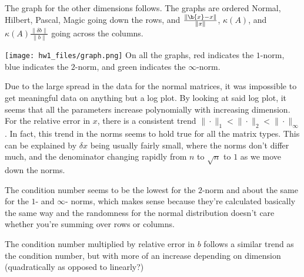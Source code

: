 \documentclass{article}
\begin{document}
The graph for the other dimensions follows. The graphs are ordered Normal, Hilbert, Pascal, Magic going down the rows, and $\frac{\|\h{x}-x\|}{\|x\|}$, $\kappa(A)$, and $\kappa(A)\frac{\|\delta b\|}{\|b\|}$ going across the columns. 

\texttt{[image: hw1\_files/graph.png]}
On all the graphs, red indicates the $1$-norm, blue indicates the $2$-norm, and green indicates the $\infty$-norm.

Due to the large spread in the data for the normal matrices, it was impossible to get meaningful data on anything but a log plot. By looking at said log plot, it seems that all the parameters increase polynomially with increasing dimension. For the relative error in $x$, there is a consistent trend $\|\cdot\|_1<\|\cdot\|_2<\|\cdot\|_\infty$. In fact, this trend in the norms seems to hold true for all the matrix types. This can be explained by $\delta x$ being usually fairly small, where the norms don't differ much, and the denominator changing rapidly from $n$ to $\sqrt{n}$ to $1$ as we move down the norms. 

The condition number seems to be the lowest for the $2$-norm and about the same for the $1$- and $\infty$- norms, which makes sense because they're calculated basically the same way and the randomness for the normal distribution doesn't care whether you're summing over rows or columns. 

The condition number multiplied by relative error in $b$ follows a similar trend as the condition number, but with more of an increase depending on dimension (quadratically as opposed to linearly?)
\end{document}
